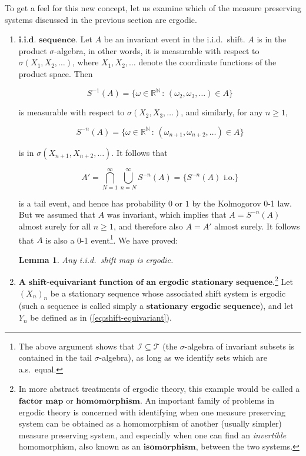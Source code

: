 \documentclass[11pt]{report}
\newcommand{\R}{\mathbb{R}}
\newcommand{\N}{\mathbb{N}}
\theoremstyle{plain}
\newtheorem{lem}[thm]{Lemma}
\theoremstyle{definition}
\begin{document}
To get a feel for this new concept, let us examine which of the measure preserving systems discussed in the previous section are ergodic.

\begin{enumerate}[label=\arabic*.]
\item $\textbf{i.i.d. sequence.}$ Let $A$ be an invariant event in the i.i.d.\ shift. $A$ is in the product $\sigma$-algebra, in other words, it is measurable with respect to $\sigma(X_1,X_2,\ldots)$, where $X_1,X_2,\ldots$ denote the coordinate functions of the product space. Then

\[
S^{-1}(A) = \{ \omega\in \R^\N \, : \, (\omega_2,\omega_3,\ldots) \in A \}
\]

is measurable with respect to $\sigma(X_2,X_3,\ldots)$, and similarly, for any $n\ge 1$,

\[
S^{-n}(A) = \{ \omega\in \R^\N \, : \, (\omega_{n+1},\omega_{n+2},\ldots) \in A \}
\]

is in $\sigma(X_{n+1},X_{n+2},\ldots)$. It follows that

\[
A'=\bigcap_{N=1}^\infty \bigcup_{n=N}^\infty S^{-n}(A) = \{ S^{-n}(A) \textrm{ i.o.} \}
\]

is a tail event, and hence has probability $0$ or $1$ by the Kolmogorov 0-1 law. But we assumed that $A$ was invariant, which implies that $A=S^{-n}(A)$ almost surely for all $n\ge 1$, and therefore also $A=A'$ almost surely. It follows that $A$ is also a 0-1 event\footnote{The above argument shows that $\mathcal{I}\subseteq\mathcal{T}$ (the $\sigma$-algebra of invariant subsets is contained in the tail $\sigma$-algebra), as long as we identify sets which are a.s.\ equal.}. We have proved:

\begin{lem}
\label{lem-iid-ergodic}
Any i.i.d.\ shift map is ergodic.
\end{lem}
\item $\textbf{A shift-equivariant function of an ergodic stationary sequence.}$\footnote{In more abstract treatments of ergodic theory, this example would be called a $\textbf{factor map}$ or $\textbf{homomorphism}$. An important family of problems in ergodic theory is concerned with identifying when one measure preserving system can be obtained as a homomorphism of another (usually simpler) measure preserving system, and especially when one can find an \emph{invertible} homomorphism, also known as an $\textbf{isomorphism}$, between the two systems.} Let $(X_n)_n$ be a stationary sequence whose associated shift system is ergodic (such a sequence is called simply a $\textbf{stationary ergodic sequence}$), and let $Y_n$ be defined as in (\ref{eq:shift-equivariant}).


\end{enumerate}
\end{document}

